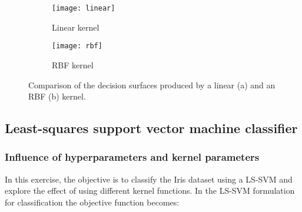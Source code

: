 \documentclass[conference,compsoc]{IEEEtran}
\begin{document}
\begin{figure}[]

\centering
        \begin{subfigure}{0.40\linewidth}
            \texttt{[image: linear]}
            \caption{Linear kernel}
        \end{subfigure}
        \begin{subfigure}{0.40\linewidth}
            \texttt{[image: rbf]}
            \caption{RBF kernel}
        \end{subfigure}
       

        \caption{Comparison of the decision surfaces produced by a linear (a) and an RBF (b) kernel. }        
        
              
        \label{fig:compare}
    \end{figure}


\subsection{
Least-squares support vector machine classifier}\label{hyperparameters}

\subsubsection{
Influence of hyperparameters and kernel parameters}

In this exercise, the objective is to classify the Iris dataset using a LS-SVM and explore the effect of using different kernel functions. In the LS-SVM formulation for classification the objective function becomes:
\end{document}
